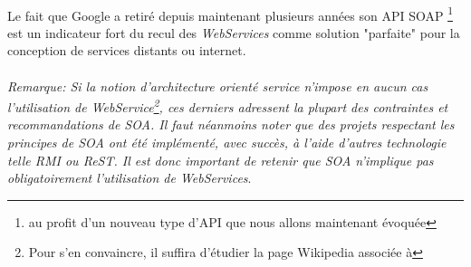 {  \paragraph{} Le fait que Google a retiré depuis maintenant plusieurs années son API SOAP
  \footnote{au profit d'un nouveau type d'API que nous allons maintenant évoquée} est un indicateur
  fort du recul des \textit{WebServices} comme solution "parfaite" pour la conception de services
  distants ou internet.

  \paragraph{} \paragraph{} \textit{Remarque: Si la notion d'architecture orienté service n'impose
  en aucun cas l'utilisation de WebService\footnote{Pour s'en convaincre, il suffira d'étudier la
  page Wikipedia associée à
  }, ces
  derniers adressent la plupart des contraintes et recommandations de SOA. Il faut néanmoins noter
  que des projets respectant les principes de SOA ont  été implémenté, avec succès, à l'aide
  d'autres technologie telle RMI ou ReST. Il est donc important de retenir que SOA n'implique pas
  obligatoirement l'utilisation de \textit{WebServices}}.
}


